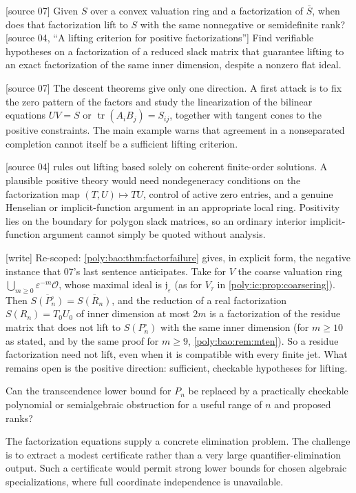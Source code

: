 \documentclass[11pt,a4paper]{article}
\numberwithin{equation}{section}
\theoremstyle{plain}
\newcommand{\wtag}{\textup{[write]}}%
\newcommand{\srcnote}[1]{\textup{[#1]}}%
\newcommand{\eps}{\varepsilon}
\newcommand{\OO}{\mathcal O}
\newcommand{\JJ}{\mathfrak j}
\newcommand{\tr}{\operatorname{tr}}%
\begin{document}
\begin{question}\label{poly:ic:q:lifting}
\srcnote{source 07} Given $S$ over a convex valuation ring and a factorization of $\bar S$,
when does that factorization lift to $S$ with the same nonnegative or
semidefinite rank?
\srcnote{source 04, ``A lifting criterion for positive factorizations''}
Find verifiable hypotheses on a factorization of a reduced slack matrix
that guarantee lifting to an exact factorization of the same inner
dimension, despite a nonzero flat ideal.
\end{question}
\srcnote{source 07} The descent theorems give only one direction. A first attack is to fix
the zero pattern of the factors and study the linearization of the
bilinear equations $UV=S$ or $\tr(A_iB_j)=S_{ij}$, together with tangent
cones to the positive constraints. The main example warns that agreement
in a nonseparated completion cannot itself be a sufficient lifting
criterion.

\srcnote{source 04}  rules out lifting based solely on coherent
finite-order solutions. A plausible positive theory would need
nondegeneracy conditions on the factorization map $(T,U)\mapsto TU$,
control of active zero entries, and a genuine Henselian or implicit-function
argument in an appropriate local ring. Positivity lies on the boundary
for polygon slack matrices, so an ordinary interior implicit-function
argument cannot simply be quoted without analysis.

\wtag{} Re-scoped: \cref{poly:bao:thm:factorfailure} gives, in explicit
form, the negative instance that 07's last sentence anticipates. Take for
$V$ the coarse valuation ring $\bigcup_{m\geq0}\eps^{-m}\OO$, whose maximal
ideal is $\JJ_\eps$ (as for $V_\tau$ in \cref{poly:ic:prop:coarsering}).
Then $\overline{S(P^\circ_n)}=\overline{S(R_n)}$, and the reduction of a
real factorization $S(R_n)=T_0U_0$ of inner dimension at most $2m$ is a
factorization of the residue matrix that does not lift to $S(P^\circ_n)$
with the same inner dimension (for $m\geq10$ as stated, and by the same
proof for $m\geq9$, \cref{poly:bao:rem:mten}). So a residue factorization
need not lift, even when it is compatible with every finite jet. What
remains open is the positive direction: sufficient, checkable hypotheses
for lifting.

\begin{question}
Can the transcendence lower bound for $P_n$ be replaced by a practically
checkable polynomial or semialgebraic obstruction for a useful range of
$n$ and proposed ranks?
\end{question}
The factorization equations supply a concrete elimination problem.
The challenge is to extract a modest certificate rather than a very
large quantifier-elimination output. Such a certificate would permit
strong lower bounds for chosen algebraic specializations, where full
coordinate independence is unavailable.
\end{document}
